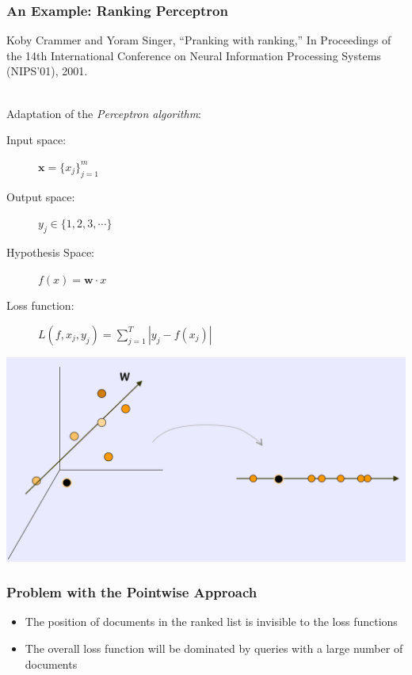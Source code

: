 \documentclass{beamer}
\begin{document}
\begin{frame}
    \frametitle{An Example:  Ranking Perceptron}
    \begin{minipage}{1.0\linewidth}
        \footnotesize Koby Crammer and Yoram Singer, ``Pranking with ranking,''
        In Proceedings of the 14th International Conference on Neural
        Information Processing Systems (NIPS'01), 2001.
    \end{minipage}\\[\baselineskip]

    Adaptation of the \textit{Perceptron algorithm}:
    \vfill
    \begin{description}
    \item[Input space:] $\mathbf{x} = \{x_j\}_{j=1}^m$
    \item[Output space:] $y_j \in \{1, 2, 3, \cdots \}$
    \item[Hypothesis Space:] $f(x) = \mathbf{w} \cdot x$
    \item[Loss function:] $L(f, x_j, y_j) = \sum_{j=1}^T|y_j - f(x_j)|$
    \end{description}
    \vfill
    \centering
    \includegraphics[width=.7\linewidth]{pranking}
\end{frame}

\begin{frame}
    \frametitle{Problem with the Pointwise Approach}
    \begin{block}{}
        \begin{itemize}
        \item The position of documents in the ranked list is invisible to the
            loss functions
        \item The overall loss function will be dominated by queries with a
            large number of documents
        \end{itemize}
    \end{block}
\end{frame}
\end{document}
